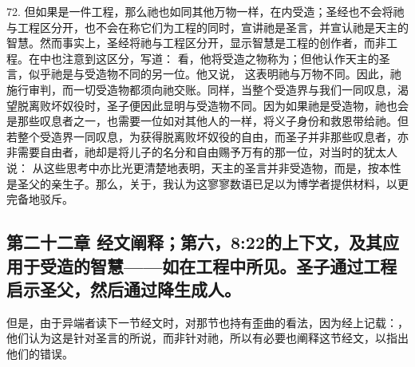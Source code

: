 72. 但如果是一件工程，那么祂也如同其他万物一样，在内受造；圣经也不会将祂与工程区分开，也不会在称它们为工程的同时，宣讲祂是圣言，并宣认祂是天主的智慧。然而事实上，圣经将祂与工程区分开，显示智慧是工程的创作者，而非工程。在中也注意到这区分，写道： 看，他将受造之物称为；但他认作天主的圣言，似乎祂是与受造物不同的另一位。他又说， 这表明祂与万物不同。因此，祂施行审判，而一切受造物都须向祂交账。同样，当整个受造界与我们一同叹息，渴望脱离败坏奴役时，圣子便因此显明与受造物不同。因为如果祂是受造物，祂也会是那些叹息者之一，也需要一位如对其他人的一样，将义子身份和救恩带给祂。但若整个受造界一同叹息，为获得脱离败坏奴役的自由，而圣子并非那些叹息者，亦非需要自由者，祂却是将儿子的名分和自由赐予万有的那一位，对当时的犹太人说： 从这些思考中亦比光更清楚地表明，天主的圣言并非受造物，而是，按本性是圣父的亲生子。那么，关于，我认为这寥寥数语已足以为博学者提供材料，以更完备地驳斥。\par


\subsection{第二十二章 经文阐释；第六，8:22的上下文，及其应用于受造的智慧——如在工程中所见。圣子通过工程启示圣父，然后通过降生成人。}

但是，由于异端者读下一节经文时，对那节也持有歪曲的看法，因为经上记载：，他们认为这是针对圣言的所说，而非针对祂，所以有必要也阐释这节经文，以指出他们的错误。\par

